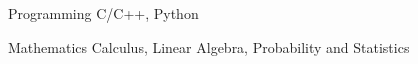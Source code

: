


\begin{cvskills}


\cvskill
{Programming} %
{C/C++, Python} %


\cvskill
{Mathematics} %
{Calculus, Linear Algebra, Probability and Statistics} %


\end{cvskills}
